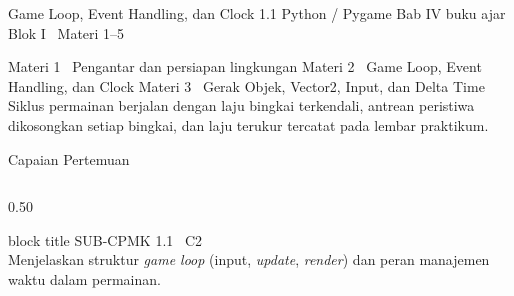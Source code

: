 \documentclass[aspectratio=169,10pt]{beamer}
\begin{document}
  {Game Loop, Event Handling, dan Clock}
  {1.1}
  {Python / Pygame}
  {Bab IV buku ajar}
  {Blok I \textperiodcentered\ Materi 1--5}

  {Materi 1 \textperiodcentered\ Pengantar dan persiapan lingkungan}
  {Materi 2 \textperiodcentered\ Game Loop, Event Handling, dan Clock}
  {Materi 3 \textperiodcentered\ Gerak Objek, Vector2, Input, dan Delta Time}
  {Siklus permainan berjalan dengan laju bingkai terkendali, antrean
   peristiwa dikosongkan setiap bingkai, dan laju terukur tercatat pada
   lembar praktikum.}

\begin{frame}{Capaian Pertemuan}
\begin{columns}[T,onlytextwidth]
  \begin{column}{0.50\textwidth}
    \begin{beamercolorbox}[wd=\linewidth,sep=5pt,rounded=true]{block title}
      {\fontsize{6.8}{8}\selectfont\color{ubHead}SUB-CPMK 1.1 \textperiodcentered\ C2}\\[2pt]
      {\footnotesize Menjelaskan struktur \emph{game loop} (input,
       \emph{update}, \emph{render}) dan peran manajemen waktu dalam
       permainan.}
    \end{beamercolorbox}
    \vspace{0.14cm}


\end{column}
\end{columns}
\end{frame}
\end{document}

